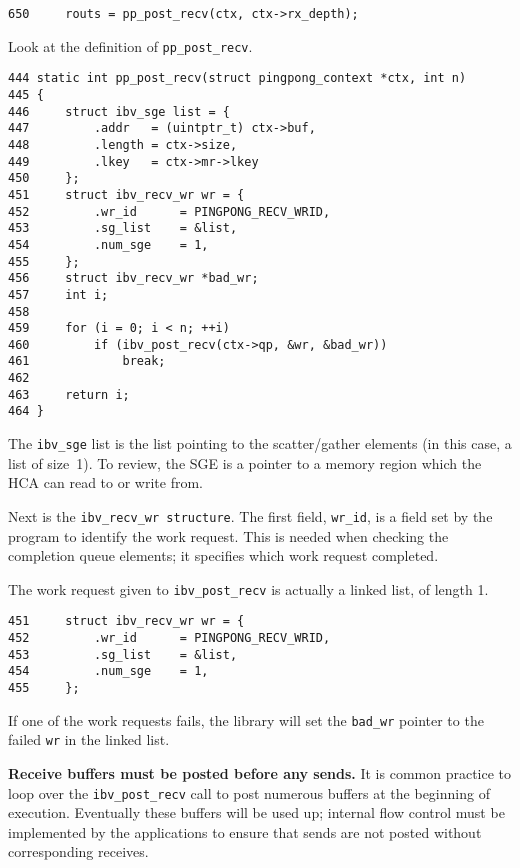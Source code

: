 \documentclass[letterpaper,12pt]{article}
\begin{document}
\lstset{language=C, caption=}
\begin{lstlisting}
650     routs = pp_post_recv(ctx, ctx->rx_depth);
\end{lstlisting}

Look at the definition of {\tt pp\_post\_recv}.

\lstset{language=C, caption=Posting Recv Requests}
\begin{lstlisting}
444 static int pp_post_recv(struct pingpong_context *ctx, int n)
445 {
446     struct ibv_sge list = {
447         .addr   = (uintptr_t) ctx->buf,
448         .length = ctx->size,
449         .lkey   = ctx->mr->lkey
450     };
451     struct ibv_recv_wr wr = {
452         .wr_id      = PINGPONG_RECV_WRID,
453         .sg_list    = &list,
454         .num_sge    = 1,
455     };
456     struct ibv_recv_wr *bad_wr;
457     int i;
458
459     for (i = 0; i < n; ++i)
460         if (ibv_post_recv(ctx->qp, &wr, &bad_wr))
461             break;
462
463     return i;
464 }
\end{lstlisting}

The {\tt ibv\_sge} list is the list pointing to the scatter/gather elements
(in this case, a list of size~1).  To review, the SGE is a pointer to
a memory region which the HCA can read to or write from.

Next is the {\tt ibv\_recv\_wr structure}. The first field, {\tt wr\_id}, is a field
set by the program to identify the work request.  This is needed
when checking the completion queue elements; it specifies which work
request completed.

The work request given to {\tt ibv\_post\_recv} is actually a linked
list, of length 1.

\lstset{language=C, caption=Linked List}
\begin{lstlisting}
451     struct ibv_recv_wr wr = {
452         .wr_id      = PINGPONG_RECV_WRID,
453         .sg_list    = &list,
454         .num_sge    = 1,
455     };
\end{lstlisting}

If one of the work requests fails, the library
will set the {\tt bad\_wr} pointer to the failed {\tt wr} in the linked list.

{\bf Receive buffers must be posted before any sends.} It is common
practice to loop over the {\tt ibv\_post\_recv} call to post numerous buffers
at the beginning of execution. Eventually these buffers will be used up;
internal flow control must be implemented by the applications to ensure
that sends are not posted without corresponding receives.
\end{document}
